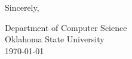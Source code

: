 \documentclass{article}
\begin{document}


Sincerely,

\vspace{1cm}

Department of Computer Science\\
Oklahoma State University\\
\today{}
\end{document}
